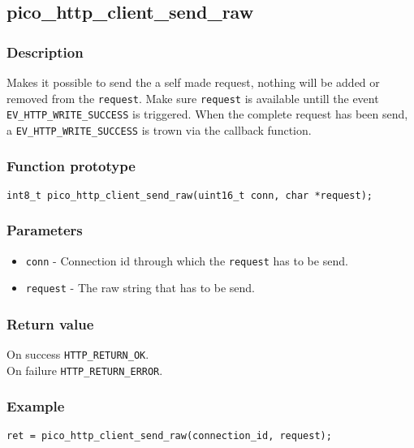 
\subsection{pico\_http\_client\_send\_raw}

\subsubsection*{Description}
Makes it possible to send the a self made request, nothing will be added or removed from the \texttt{request}.
Make sure \texttt{request} is available untill the event \texttt{EV\_HTTP\_WRITE\_SUCCESS} is triggered. When the complete request has been send, a \texttt{EV\_HTTP\_WRITE\_SUCCESS} is trown via the callback function.

\subsubsection*{Function prototype}
\texttt{int8\_t pico\_http\_client\_send\_raw(uint16\_t conn, char *request);}

\subsubsection*{Parameters}
\begin{itemize}[noitemsep]
\item \texttt{conn} - Connection id through which the \texttt{request} has to be send.
\item \texttt{request} - The raw string that has to be send.
\end{itemize}

\subsubsection*{Return value}
On success \texttt{HTTP\_RETURN\_OK}.
\\On failure \texttt{HTTP\_RETURN\_ERROR}.

\subsubsection*{Example}
\begin{verbatim}
ret = pico_http_client_send_raw(connection_id, request);
\end{verbatim}


